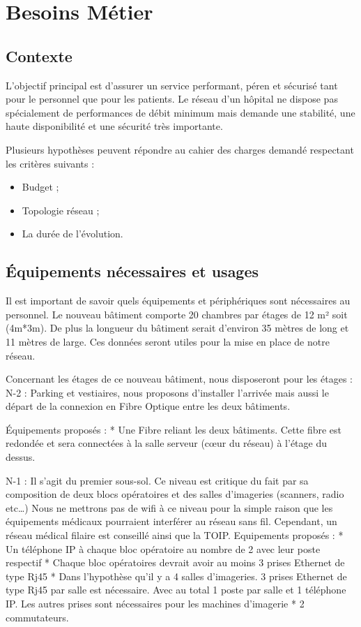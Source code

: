 \section{Besoins Métier}

%
%
\subsection{Contexte}

L’objectif principal est d’assurer un service performant, péren et sécurisé tant pour le personnel que pour les patients.
Le réseau d'un hôpital ne dispose pas spécialement de performances de débit minimum mais demande une stabilité, une haute disponibilité et une sécurité très importante.

Plusieurs hypothèses peuvent répondre au cahier des charges demandé respectant les critères suivants :
\begin{itemize}
\item Budget ;
\item Topologie réseau ;
\item La durée de l’évolution.
\end{itemize}


%
%
\subsection{Équipements nécessaires et usages}

Il est important de savoir quels équipements et périphériques sont nécessaires au personnel.
Le nouveau bâtiment comporte 20 chambres par étages de 12 m² soit (4m*3m).
De plus la longueur du bâtiment serait d’environ 35 mètres de long et 11 mètres de large.
Ces données seront utiles pour la mise en place de notre réseau.


Concernant les étages de ce nouveau bâtiment, nous disposeront pour les étages :
N-2 : Parking et vestiaires, nous proposons d’installer l’arrivée mais aussi le départ de la connexion en Fibre Optique entre les deux bâtiments.


Équipements proposés :
* Une Fibre reliant les deux bâtiments. Cette fibre est redondée et sera connectées à la salle serveur (cœur du réseau) à l’étage du dessus.


N-1 : Il s’agit du premier sous-sol. Ce niveau est critique du fait par sa composition de deux blocs opératoires et des salles d’imageries (scanners, radio etc…) Nous ne mettrons pas de wifi à ce niveau pour la simple raison que les équipements médicaux pourraient interférer au réseau sans fil. Cependant, un réseau médical filaire est conseillé ainsi que la TOIP.
Equipements proposés :
* Un téléphone IP à chaque bloc opératoire au nombre de 2 avec leur poste respectif
* Chaque bloc opératoires devrait avoir au moins 3 prises Ethernet de type Rj45
* Dans l’hypothèse qu’il y a 4 salles d’imageries. 3 prises Ethernet de type Rj45 par salle est nécessaire. Avec au total 1 poste par salle et 1 téléphone IP. Les autres prises sont nécessaires pour les machines d’imagerie
* 2 commutateurs.


